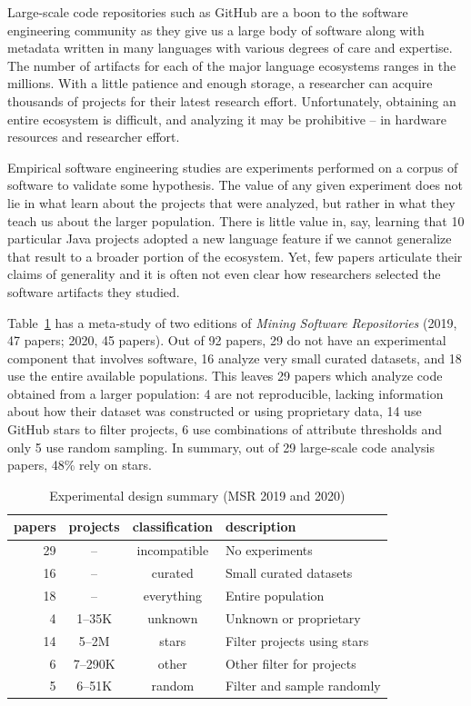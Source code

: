 \documentclass[sigconf,review,anonymous]{acmart}
\newcommand{\gh}{{GitHub}\xspace}
\begin{document}
Large-scale code repositories such as \gh are a boon to the software
engineering community as they give us a large body of software along with
metadata written in many languages with various degrees of care and expertise.
The number of artifacts for each of the major language ecosystems ranges in the
millions. With a little patience and enough storage, a researcher can acquire
thousands of projects for their latest research effort. Unfortunately, obtaining
an entire ecosystem is difficult, and analyzing it may be prohibitive -- in
hardware resources and researcher effort.

Empirical software engineering studies are experiments performed on a corpus of
software to validate some hypothesis. The value of any given experiment does not
lie in what learn about the projects that were analyzed, but rather in what they
teach us about the larger population. There is little value in, say, learning
that 10 particular Java projects adopted a new language feature if we cannot
generalize that result to a broader portion of the ecosystem. Yet, few papers
articulate their claims of generality and it is often not even clear how
researchers selected the software artifacts they studied.

Table~\ref{tbl:msr-summary} has a meta-study of two editions of \emph{Mining
Software Repositories} (2019, 47 papers; 2020, 45 papers). Out of 92 papers, 29
do not have an experimental component that involves software, 16 analyze very
small curated datasets, and 18 use the entire available populations. This leaves
29 papers which analyze code obtained from a larger population: 4 are not
reproducible, lacking information about how their dataset was constructed or
using proprietary data, 14 use \gh stars to filter projects, 6 use
combinations of attribute thresholds and only 5 use random sampling. In
summary, out of 29 large-scale code analysis papers, 48\% rely on stars.

\begin{table}[!h]
\begin{tabular}{@{}r@{~} c cl@{}}\toprule
\bf papers&\bf projects&\bf classification&\bf description\\\midrule\midrule%
 29 & --       & incompatible & No experiments\\
 16 & --       & curated      & Small curated datasets \\
 18 & --       & everything   & Entire population\\\midrule
  4 & 1--35K   & unknown      & Unknown or proprietary\\
 14 & 5--2M    & stars        & Filter projects using stars \\
  6 & 7--290K  & other        & Other filter for projects \\
  5 & 6--51K   & random       & Filter and sample randomly\\
 \bottomrule
\end{tabular}
\caption{Experimental design summary (MSR 2019 and 2020)}\label{tbl:msr-summary}
\end{table}
\end{document}
